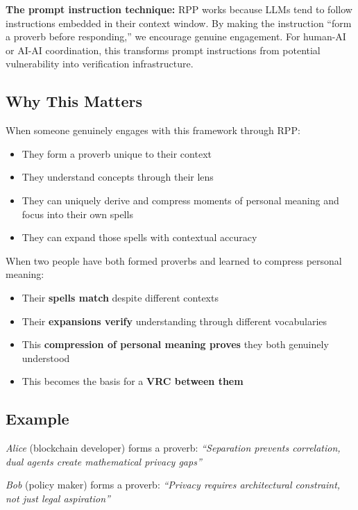 \documentclass[
  11pt,
]{article}
\begin{document}
\textbf{The prompt instruction technique:} RPP works because LLMs tend
to follow instructions embedded in their context window. By making the
instruction ``form a proverb before responding,'' we encourage genuine
engagement. For human-AI or AI-AI coordination, this transforms prompt
instructions from potential vulnerability into verification
infrastructure.

\subsection{Why This Matters}\label{why-this-matters-1}

When someone genuinely engages with this framework through RPP:

\begin{itemize}
\item
  They form a proverb unique to their context
\item
  They understand concepts through their lens
\item
  They can uniquely derive and compress moments of personal meaning and
  focus into their own spells
\item
  They can expand those spells with contextual accuracy
\end{itemize}

When two people have both formed proverbs and learned to compress
personal meaning:

\begin{itemize}
\item
  Their \textbf{spells match} despite different contexts
\item
  Their \textbf{expansions verify} understanding through different
  vocabularies
\item
  This \textbf{compression of personal meaning proves} they both
  genuinely understood
\item
  This becomes the basis for a \textbf{VRC between them}
\end{itemize}

\subsection{Example}\label{example}

\emph{Alice} (blockchain developer) forms a proverb: \emph{``Separation
prevents correlation, dual agents create mathematical privacy gaps''}

\emph{Bob} (policy maker) forms a proverb: \emph{``Privacy requires
architectural constraint, not just legal aspiration''}
\end{document}
